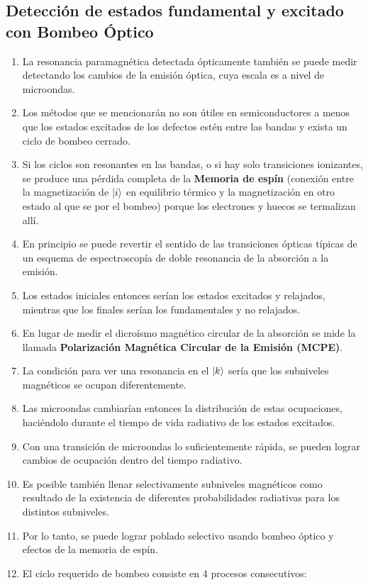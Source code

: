 \documentclass[aps,rmp,reprint,longbibliography]{revtex4-1}
\begin{document}
\subsection{Detección de estados fundamental y excitado con Bombeo Óptico} 
\begin{enumerate}\item La resonancia paramagnética detectada ópticamente también se puede medir detectando los cambios de la emisión óptica, cuya escala es a nivel de microondas.
\item Los métodos que se mencionarán no son útiles en semiconductores a menos que los estados excitados de los defectos estén entre las bandas y exista un ciclo de bombeo cerrado. 
\item Si los ciclos son resonantes en las bandas, o si hay solo transiciones ionizantes, se produce una pérdida completa de la \textbf{Memoria de espín} (conexión entre la magnetización de $\ket{i}$  en equilibrio térmico y la magnetización en otro estado al que se por el bombeo) porque los electrones y huecos se termalizan allí. 
\item En principio se puede revertir el sentido de las transiciones ópticas típicas de un esquema de espectroscopía de doble resonancia de la absorción a la emisión. 
\item Los estados iniciales entonces serían los estados excitados y relajados, mientras que los finales serían los fundamentales y no relajados. 
\item En lugar de medir el dicroísmo magnético circular de la absorción se mide la llamada \textbf{Polarización Magnética Circular de la Emisión (MCPE)}.
\item La condición para ver una resonancia en el $\ket{k}$ sería que los subniveles magnéticos se ocupan diferentemente. 
\item Las microondas cambiarían entonces la distribución de estas ocupaciones, haciéndolo durante el tiempo de vida radiativo de los estados excitados. 
\item Con una transición de microondas lo suficientemente rápida, se pueden lograr cambios de ocupación dentro del tiempo radiativo.
\item Es posible también llenar selectivamente subniveles magnéticos como resultado de la existencia de diferentes probabilidades radiativas para los distintos subniveles. 
\item Por lo tanto, se puede lograr poblado selectivo usando bombeo óptico y efectos de la memoria de espín. 
\item El ciclo requerido de bombeo consiste en 4 procesos consecutivos:

\end{enumerate}
\end{document}
